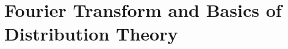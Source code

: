\documentclass[../../script.tex]{subfiles}
\begin{document}
    \chapter{Fourier Transform and Basics of Distribution Theory}
    \minitoc
    \vspace*{\fill}\par
    \pagebreak  

    
    
    
\end{document}
